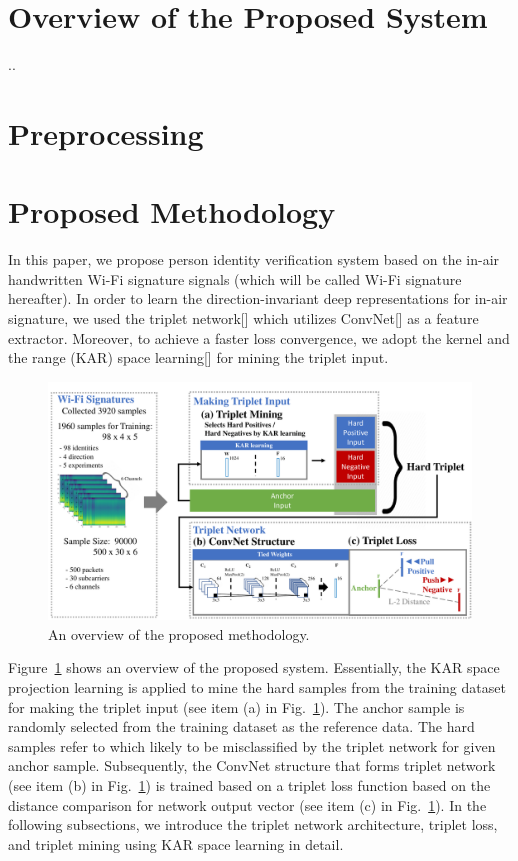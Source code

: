 \label{chp:Method}
\section{Overview of the Proposed System}
..
\cite{Leal-Taixe_2016_CVPR_Workshops}

\section{Preprocessing}
\label{sec:preprocessing}

\section{Proposed Methodology}
\label{sec:methodology}
In this paper, we propose person identity verification system based on the in-air handwritten Wi-Fi signature signals (which will be called Wi-Fi signature hereafter). 
In order to learn the direction-invariant deep representations for in-air signature, we used the triplet network[] which utilizes ConvNet[] as a feature extractor. Moreover, to achieve a faster loss convergence, we adopt the kernel and the range (KAR) space learning[] for mining the triplet input. 
\begin{figure}[!ht]
    \includegraphics[width=\textwidth]
        {fig_system_overview_v1.pdf}
    \caption{An overview of the proposed methodology.} \label{fig1}
\end{figure}
Figure~\ref{fig1} shows an overview of the proposed system. 
Essentially, the KAR space projection learning is applied to mine the hard samples from the training dataset for making the triplet input (see item (a) in Fig.~\ref{fig1}). The anchor sample is randomly selected from the training dataset as the reference data. The hard samples refer to which likely to be misclassified by the triplet network for given anchor sample.
Subsequently, the ConvNet structure that forms triplet network (see item (b) in Fig.~\ref{fig1}) is trained based on a triplet loss function based on the distance comparison for network output vector (see item (c) in Fig.~\ref{fig1}).
In the following subsections, we introduce the triplet network architecture, triplet loss, and triplet mining using KAR space learning in detail.

